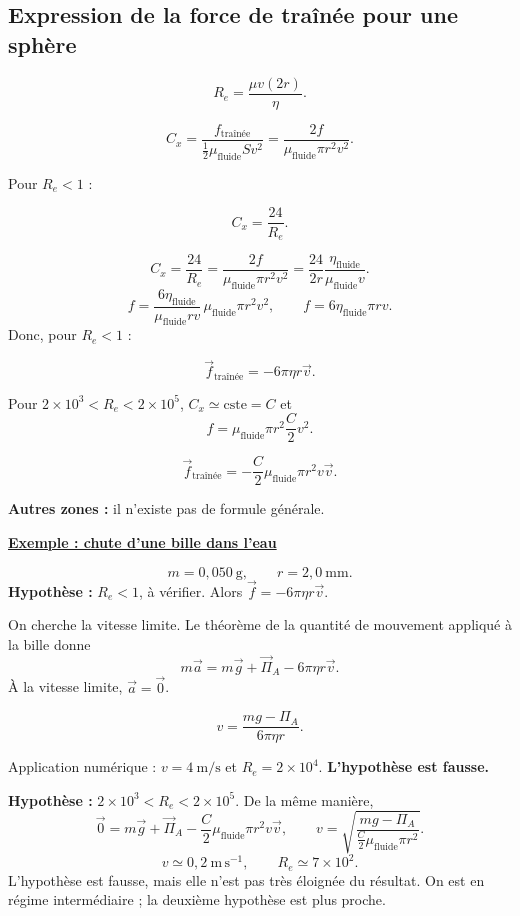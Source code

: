 \documentclass[11pt,a4paper]{article}
\newcommand{\vv}{\vec v}
\newcommand{\cste}{\mathrm{cste}}
\newcommand{\titr}[1]{\par\needspace{4\baselineskip}\textbf{\underline{#1}}\par}
\begin{document}
\subsection{Expression de la force de traînée pour une sphère}
\begin{center}\end{center}
\[R_e=\frac{\mu v(2r)}{\eta}.\]
\begin{cadre}\[C_x=\frac{f_{\text{traînée}}}{\tfrac12\mu_{\mathrm{fluide}}Sv^2}
=\frac{2f}{\mu_{\mathrm{fluide}}\pi r^2v^2}.\]\end{cadre}
Pour $R_e<1$ :
\begin{cadre}\[C_x=\frac{24}{R_e}.\]\end{cadre}
\[C_x=\frac{24}{R_e}=\frac{2f}{\mu_{\mathrm{fluide}}\pi r^2v^2}
=\frac{24}{2r}\frac{\eta_{\mathrm{fluide}}}{\mu_{\mathrm{fluide}}v}.\]
\[f=\frac{6\eta_{\mathrm{fluide}}}{\mu_{\mathrm{fluide}}rv}\,\mu_{\mathrm{fluide}}\pi r^2v^2,\qquad
f=6\eta_{\mathrm{fluide}}\pi rv.\]
Donc, pour $R_e<1$ :
\begin{cadre}[etoiles={\mathord{\star}\,\mathord{\star}\,\mathord{\star}\,\mathord{\star}}]\[\vec f_{\text{traînée}}=-6\pi\eta r\vv.\]\end{cadre}
Pour $2\times10^3<R_e<2\times10^5$, $C_x\simeq\cste=C$ et
\[f=\mu_{\mathrm{fluide}}\pi r^2\frac C2v^2.\]
\begin{cadre}[etoiles={\mathord{\star}\,\mathord{\star}\,\mathord{\star}\,\mathord{\star}\,\mathord{\star}}]\[\vec f_{\text{traînée}}=-\frac C2\mu_{\mathrm{fluide}}\pi r^2v\vv.\]\end{cadre}
\textbf{Autres zones :} il n'existe pas de formule générale.
\begin{exemple}
\titr{Exemple : chute d'une bille dans l'eau}
\[m=0{,}050\ \mathrm g,\qquad r=2{,}0\ \mathrm{mm}.\]
\textbf{Hypothèse :} $R_e<1$, à vérifier. Alors $\vec f=-6\pi\eta r\vv$.

On cherche la vitesse limite. Le théorème de la quantité de mouvement appliqué à la bille donne
\[m\vec a=m\vec g+\vec\Pi_A-6\pi\eta r\vv.\]
À la vitesse limite, $\vec a=\vec0$.
\begin{cadre}\[v=\frac{mg-\Pi_A}{6\pi\eta r}.\]\end{cadre}
Application numérique : $v=4\ \mathrm{m/s}$ et $R_e=2\times10^4$. \textbf{L'hypothèse est fausse.}

\textbf{Hypothèse :} $2\times10^3<R_e<2\times10^5$. De la même manière,
\[\vec0=m\vec g+\vec\Pi_A-\frac C2\mu_{\mathrm{fluide}}\pi r^2v\vv,\qquad
v=\sqrt{\frac{mg-\Pi_A}{\tfrac C2\mu_{\mathrm{fluide}}\pi r^2}}.\]
\[v\simeq0{,}2\ \mathrm{m\,s^{-1}},\qquad R_e\simeq7\times10^2.\]
L'hypothèse est fausse, mais elle n'est pas très éloignée du résultat. On est en régime intermédiaire ; la deuxième hypothèse est plus proche.
\end{exemple}
\end{document}
